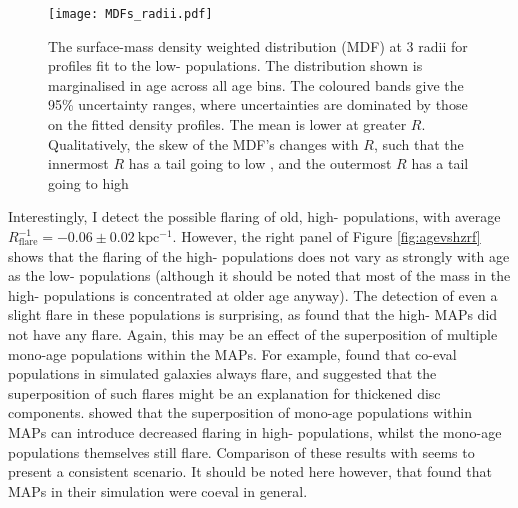 \begin{figure}
	\texttt{[image: MDFs\_radii.pdf]}
 	\centering
   \caption[Surface-mass denisty weighted \feh{} distribution in 3 radial bins, as found from measurement of mono-age, mono-\feh{} populations in APOGEE DR12]{The surface-mass density weighted \feh{} distribution (MDF) at 3 radii for profiles fit to the low-\afe{} populations. The distribution shown is marginalised in age across all age bins. The coloured bands give the 95\% uncertainty ranges, where uncertainties are dominated by those on the fitted density profiles. The mean \feh{} is lower at greater $R$. Qualitatively, the skew of the MDF's changes with $R$, such that the innermost $R$ has a tail going to low \feh{}, and the outermost $R$ has a tail going to high \feh{}}
     \label{fig:mdf}
 \end{figure}

Interestingly, I detect the possible flaring of old, high-\afe{} populations, with average $R_{\mathrm{flare}}^{-1} = -0.06 \pm 0.02\ \mathrm{kpc^{-1}}$. However, the right panel of Figure \ref{fig:agevshzrf} shows that the flaring of the high-\afe{} populations does not vary as strongly with age as the low-\afe{} populations (although it should be noted that most of the mass in the high-\afe{} populations is concentrated at older age anyway). The detection of even a slight flare in these populations is surprising, as \citet{2016ApJ...823...30B} found that the high-\afe{} MAPs did not have any flare. Again, this may be an effect of the superposition of multiple mono-age populations within the MAPs. For example, \citet{2015ApJ...804L...9M} found that co-eval populations in simulated galaxies always flare, and suggested that the superposition of such flares might be an explanation for thickened disc components. \citet{2017ApJ...834...27M} showed that the superposition of mono-age populations within MAPs can introduce decreased flaring in high-\afe{} populations, whilst the mono-age populations themselves still flare. Comparison of these results with \citet{2016ApJ...823...30B} seems to present a consistent scenario. It should be noted here however, that \citet{2013MNRAS.436..625S} found that MAPs in their simulation were coeval in general.

